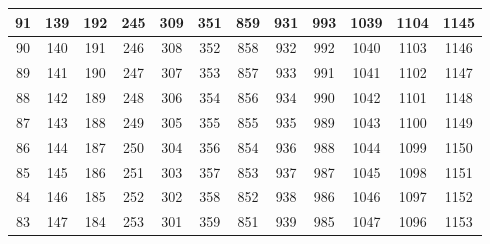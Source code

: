 \begin{table}
\begin{center}
{\begin{tabular} {| c | c | c | c | c | c | c | c | c | c | c | c | }
 91                      & 139                      &  192 & 245 & 309                      & 351                      & 859 & 931                      &  993                      & 1039 & 1104                       & 1145                      \\ \hline
 90                      & 140                      &  191 & 246 & 308                      & 352                      & 858 & 932                      &  992                      & 1040 & 1103                       & 1146                      \\ \hline
 89                      & 141                      &  190 & 247 & 307                      & 353                      & 857 & 933                      &  991                      & 1041 & 1102                       & 1147                      \\ \hline
 88                      & 142                      &  189 & 248 & 306                      & 354                      & 856 & 934                      &  990                      & 1042 & 1101                       & 1148                      \\ \hline
 87                      & 143                      &  188 & 249 & 305                      & 355                      & 855 & 935                      &  989                      & 1043 & 1100                       & 1149                      \\ \hline
 86                      & 144                      &  187 & 250 & 304                      & 356                      & 854 & 936                      &  988                      & 1044 & 1099                       & 1150                      \\ \hline
 85                      & 145                      &  186 & 251 & 303                      & 357                      & 853 & 937                      &  987                      & 1045 & 1098                       & 1151                      \\ \hline
 84                      & 146                      &  185 & 252 & 302                      & 358                      & 852 & 938                      &  986                      & 1046 & 1097                       & 1152                      \\ \hline
 83                      & 147                      &  184 & 253 & 301                      & 359                      & 851 & 939                      &  985                      & 1047 & 1096                       & 1153                      \\ \hline

\end{tabular}}
\end{center}
\end{table}
